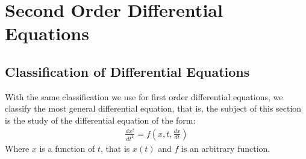\section{Second Order Differential Equations}
\subsection{Classification of Differential Equations}
With the same classification we use for first order differential equations, we classify the most general differential equation, that is, the subject of this section is the study of the differential equation of the form:
\begin{align*}
\frac{dx^2}{dt^2}= f(x,t, \frac{dx}{dt})
\end{align*}
Where $x$ is a function of $t$, that is $x(t)$ and $f$ is an arbitrary function.

